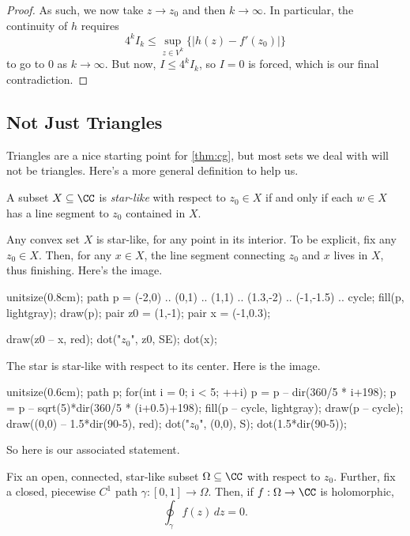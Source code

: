 \begin{proof}
	As such, we now take $z\to z_0$ and then $k\to\infty$. In particular, the continuity of $h$ requires
	\[4^kI_k\le\sup_{z\in V^k}\{|h(z)-f'(z_0)|\}\]
	to go to $0$ as $k\to\infty$. But now, $I\le 4^kI_k$, so $I=0$ is forced, which is our final contradiction.
\end{proof}

\subsection{Not Just Triangles}
Triangles are a nice starting point for \autoref{thm:cg}, but most sets we deal with will not be triangles. Here's a more general definition to help us.
\begin{definition}
	A subset $X\subseteq\CC$ is \textit{star-like} with respect to $z_0\in X$ if and only if each $w\in X$ has a line segment to $z_0$ contained in $X$.
\end{definition}
\begin{example}
	Any convex set $X$ is star-like, for any point in its interior. To be explicit, fix any $z_0\in X$. Then, for any $x\in X$, the line segment connecting $z_0$ and $x$ lives in $X$, thus finishing. Here's the image.
	\begin{center}
		\begin{asy}
			unitsize(0.8cm);
			path p = (-2,0) .. (0,1) .. (1,1) .. (1.3,-2) .. (-1,-1.5) .. cycle;
			fill(p, lightgray);
			draw(p);
			pair z0 = (1,-1);
			pair x = (-1,0.3);

			draw(z0 -- x, red);
			dot("$z_0$", z0, SE);
			dot(x);
		\end{asy}
	\end{center}
\end{example}
\begin{ex}
	The star is star-like with respect to its center. Here is the image.
	\begin{center}
		\begin{asy}
			unitsize(0.6cm);
			path p;
			for(int i = 0; i < 5; ++i)
			{
				p = p -- dir(360/5 * i+198);
				p = p -- sqrt(5)*dir(360/5 * (i+0.5)+198);
			}
			fill(p -- cycle, lightgray);
			draw(p -- cycle);
			draw((0,0) -- 1.5*dir(90-5), red);
			dot("$z_0$", (0,0), S);
			dot(1.5*dir(90-5));
		\end{asy}
	\end{center}
\end{ex}
So here is our associated statement.
\begin{theorem}
	Fix an open, connected, star-like subset $\Omega\subseteq\CC$ with respect to $z_0$. Further, fix a closed, piecewise $C^1$ path $\gamma:[0,1]\to\Omega$. Then, if $f:\Omega\to\CC$ is holomorphic,
	\[\oint_\gamma f(z)\,dz=0.\]
\end{theorem}
